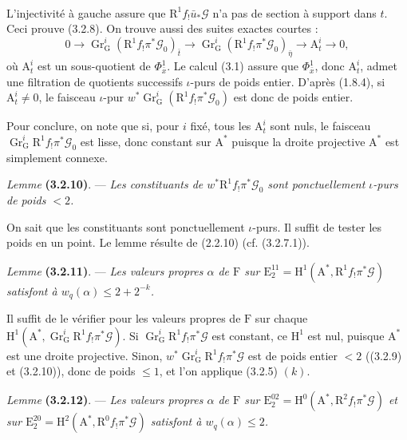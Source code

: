 \documentclass[11pt,leqno]{article}
\newcommand{\Page}[1]{\ifvmode\noindent\else\unskip\ \fi{\footnotesize\textcolor{gray}{[p.\,#1]}}\ \ignorespaces}
\begin{document}
\Page{203}

L’injectivité à gauche assure que \(\mathrm{R}^1f_!\bar{u}_*\mathscr{G}\) n’a pas de section à support dans \(t\). Ceci prouve (3.2.8). On trouve aussi des suites exactes courtes :
\[
0\to\operatorname{Gr}_{\mathrm{G}}^i
(\mathrm{R}^1f_!\pi^*\mathscr{G}_0)_{\bar{t}}
\to\operatorname{Gr}_{\mathrm{G}}^i
(\mathrm{R}^1f_!\pi^*\mathscr{G}_0)_{\bar{\eta}}
\to\mathrm{A}_t^i\to0,
\]
où \(\mathrm{A}_t^i\) est un sous-quotient de \(\Phi_{\bar{x}}^1\). Le calcul (3.1) assure que \(\Phi_{\bar{x}}^1\), donc \(\mathrm{A}_t^i\), admet une filtration de quotients successifs \(\iota\)-purs de poids entier. D’après (1.8.4), si \(\mathrm{A}_t^i\neq0\), le faisceau \(\iota\)-pur \(w^*\operatorname{Gr}_{\mathrm{G}}^i(\mathrm{R}^1f_!\pi^*\mathscr{G}_0)\) est donc de poids entier.

Pour conclure, on note que si, pour \(i\) fixé, tous les \(\mathrm{A}_t^i\) sont nuls, le faisceau \(\operatorname{Gr}_{\mathrm{G}}^i\mathrm{R}^1f_!\pi^*\mathscr{G}_0\) est lisse, donc constant sur \(\mathrm{A}^*\) puisque la droite projective \(\mathrm{A}^*\) est simplement connexe.

\textit{Lemme} \textbf{(3.2.10)}. — \textit{Les constituants de \(w^*\mathrm{R}^1f_!\pi^*\mathscr{G}_0\) sont ponctuellement \(\iota\)-purs de poids \(<2\).}

On sait que les constituants sont ponctuellement \(\iota\)-purs. Il suffit de tester les poids en un point. Le lemme résulte de (2.2.10) (cf. (3.2.7.1)).

\textit{Lemme} \textbf{(3.2.11)}. — \textit{Les valeurs propres \(\alpha\) de \(\mathrm{F}\) sur \(\mathrm{E}_2^{11}=\mathrm{H}^1(\mathrm{A}^*,\mathrm{R}^1f_!\pi^*\mathscr{G})\) satisfont à \(w_q(\alpha)\leq2+2^{-k}\).}

Il suffit de le vérifier pour les valeurs propres de \(\mathrm{F}\) sur chaque \(\mathrm{H}^1(\mathrm{A}^*,\operatorname{Gr}_{\mathrm{G}}^i\mathrm{R}^1f_!\pi^*\mathscr{G})\). Si \(\operatorname{Gr}_{\mathrm{G}}^i\mathrm{R}^1f_!\pi^*\mathscr{G}\) est constant, ce \(\mathrm{H}^1\) est nul, puisque \(\mathrm{A}^*\) est une droite projective. Sinon, \(w^*\operatorname{Gr}_{\mathrm{G}}^i\mathrm{R}^1f_!\pi^*\mathscr{G}\) est de poids entier \(<2\) ((3.2.9) et (3.2.10)), donc de poids \(\leq1\), et l’on applique (3.2.5) \((k)\).

\textit{Lemme} \textbf{(3.2.12)}. — \textit{Les valeurs propres \(\alpha\) de \(\mathrm{F}\) sur \(\mathrm{E}_2^{02}=\mathrm{H}^0(\mathrm{A}^*,\mathrm{R}^2f_!\pi^*\mathscr{G})\) et sur \(\mathrm{E}_2^{20}=\mathrm{H}^2(\mathrm{A}^*,\mathrm{R}^0f_!\pi^*\mathscr{G})\) satisfont à \(w_q(\alpha)\leq2\).}
\end{document}
